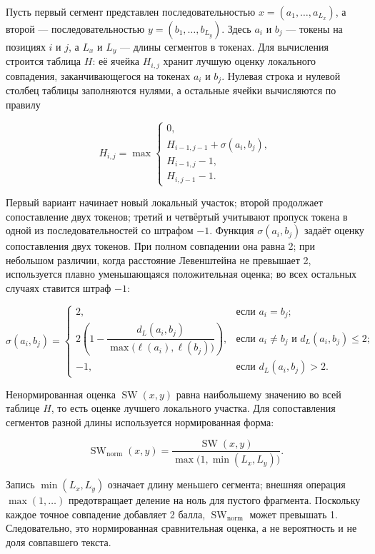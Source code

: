 Пусть первый сегмент представлен последовательностью $x=(a_1,\ldots,a_{L_x})$, а второй --- последовательностью $y=(b_1,\ldots,b_{L_y})$. Здесь $a_i$ и $b_j$ --- токены на позициях $i$ и $j$, а $L_x$ и $L_y$ --- длины сегментов в токенах. Для вычисления строится таблица $H$: её ячейка $H_{i,j}$ хранит лучшую оценку локального совпадения, заканчивающегося на токенах $a_i$ и $b_j$. Нулевая строка и нулевой столбец таблицы заполняются нулями, а остальные ячейки вычисляются по правилу

\begin{equation}
H_{i,j}=\max
\begin{cases}
0,\\
H_{i-1,j-1}+\sigma(a_i,b_j),\\
H_{i-1,j}-1,\\
H_{i,j-1}-1.
\end{cases}
\end{equation}

Первый вариант начинает новый локальный участок; второй продолжает сопоставление двух токенов; третий и четвёртый учитывают пропуск токена в одной из последовательностей со штрафом $-1$. Функция $\sigma(a_i,b_j)$ задаёт оценку сопоставления двух токенов. При полном совпадении она равна 2; при небольшом различии, когда расстояние Левенштейна не превышает 2, используется плавно уменьшающаяся положительная оценка; во всех остальных случаях ставится штраф $-1$:

\begin{equation}
\sigma(a_i,b_j)=
\begin{cases}
2, & \text{если }a_i=b_j;\\[3pt]
2\left(1-\dfrac{d_L(a_i,b_j)}
{\max\bigl(\ell(a_i),\ell(b_j)\bigr)}\right),
& \text{если }a_i\neq b_j\text{ и }d_L(a_i,b_j)\leq2;\\[8pt]
-1, & \text{если }d_L(a_i,b_j)>2.
\end{cases}
\end{equation}

Ненормированная оценка $\operatorname{SW}(x,y)$ равна наибольшему значению во всей таблице $H$, то есть оценке лучшего локального участка. Для сопоставления сегментов разной длины используется нормированная форма:

\begin{equation}
\operatorname{SW}_{\mathrm{norm}}(x,y)=
\frac{\operatorname{SW}(x,y)}{\max\bigl(1,\min(L_x,L_y)\bigr)}.
\end{equation}

Запись $\min(L_x,L_y)$ означает длину меньшего сегмента; внешняя операция $\max(1,\ldots)$ предотвращает деление на ноль для пустого фрагмента. Поскольку каждое точное совпадение добавляет 2 балла, $\operatorname{SW}_{\mathrm{norm}}$ может превышать 1. Следовательно, это нормированная сравнительная оценка, а не вероятность и не доля совпавшего текста.

